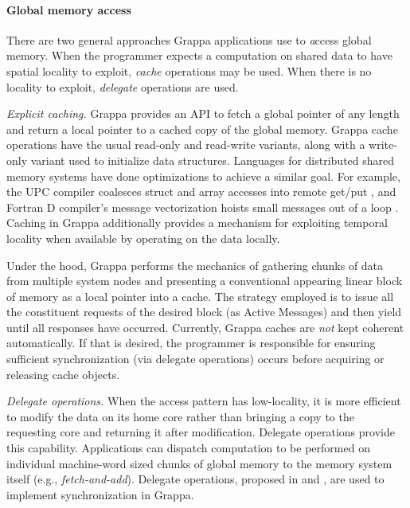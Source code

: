 \paragraph{Global memory access} There are two general approaches
Grappa applications use to {\emph access} global memory. When the
programmer expects a computation on shared data to have spatial locality
to exploit, {\em cache} operations may be used. When there is no
locality to exploit, {\em delegate} operations are used.

\textit{Explicit caching.} Grappa provides an API to fetch a global pointer of
any length and return a local pointer to a cached copy of the global memory.
Grappa cache operations have the usual read-only and read-write variants,
along with a write-only variant used to initialize data structures. Languages
for distributed shared memory systems have done optimizations to achieve a
similar goal. For example, the UPC compiler coalesces struct and array
accesses into remote get/put \cite{Chen:2005}, and Fortran D compiler's
message vectorization hoists small messages out of a loop
\cite{FortranD:1992}. Caching in Grappa additionally provides a mechanism for
exploiting temporal locality when available by operating on the data locally.

Under the hood, Grappa performs the mechanics of gathering chunks of data from
multiple system nodes and presenting a conventional appearing linear block of
memory as a local pointer into a cache. The strategy employed is to issue all
the constituent requests of the desired block (as Active Messages) and then
yield until all responses have occurred. Currently, Grappa caches are
\emph{not} kept coherent automatically. If that is desired, the programmer
is responsible for ensuring sufficient synchronization (via delegate
operations) occurs before acquiring or releasing cache objects.


\textit{Delegate operations.} When the access pattern has low-locality,
it is more efficient to modify the data on its home core rather than
bringing a copy to the requesting core and returning it after
modification. Delegate operations provide this capability. Applications
can dispatch computation to be performed on individual machine-word
sized chunks of global memory to the memory system itself (e.g.,
\emph{fetch-and-add}).  Delegate operations, proposed in
\cite{Nelson:hotpar11} and \cite{delegated:oopsla11}, are used to implement synchronization in Grappa.

